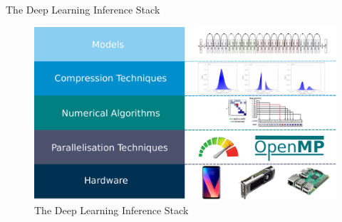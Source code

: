 \documentclass[xcolor=dvipsnames]{beamer}
\begin{document}
\begin{frame}{The Deep Learning Inference Stack}
\begin{figure}
    \centering
    \includegraphics[width=\linewidth]{images/inference-stack.pdf}
    \caption{The Deep Learning Inference Stack}
    \label{fig:inference-stack}
\end{figure}
\end{frame}
\end{document}
